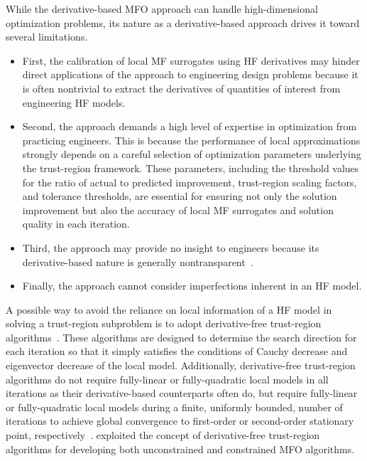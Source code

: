 \documentclass[journal ]{new-aiaa}
\begin{document}
	While the derivative-based MFO approach can handle high-dimensional optimization problems, its nature as a derivative-based approach drives it toward several limitations.
	\begin{itemize}
		\item First, the calibration of local MF surrogates using HF derivatives may hinder direct applications of the approach to engineering design problems because it is often nontrivial to extract the derivatives of quantities of interest from engineering HF models.
		
		\item Second, the approach demands a high level of expertise in optimization from practicing engineers.
		This is because the performance of local approximations strongly depends on a careful selection of optimization parameters underlying the trust-region framework.
		These parameters, including the threshold values for the ratio of actual to predicted improvement, trust-region scaling factors, and tolerance thresholds, are essential for ensuring not only the solution improvement but also the accuracy of local MF surrogates and solution quality in each iteration.
		
		\item Third, the approach may provide no insight to engineers because its derivative-based nature is generally nontransparent~\citep{Wang2006}.
		
		\item Finally, the approach cannot consider imperfections inherent in an HF model.
	\end{itemize}
	
	A possible way to avoid the reliance on local information of a HF model in solving a trust-region subproblem is to adopt derivative-free trust-region algorithms~\citep{Conn2009,Wild2011}.
	These algorithms are designed to determine the search direction for each iteration so that it simply satisfies the conditions of Cauchy decrease and eigenvector decrease of the local model.
	Additionally, derivative-free trust-region algorithms do not require fully-linear or fully-quadratic local models in all iterations as their derivative-based counterparts often do, but require fully-linear or fully-quadratic local models during a finite, uniformly bounded, number of iterations to achieve global
	convergence to first-order or second-order stationary point, respectively~\citep{Conn2009}.
	\citet{March2012smo,March2012aiaa} exploited the concept of derivative-free trust-region algorithms for developing both unconstrained and constrained MFO algorithms.
	
\end{document}
